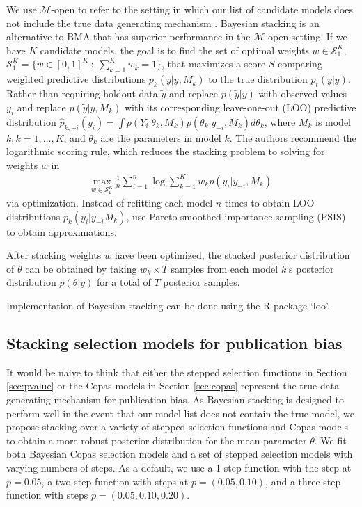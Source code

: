 \documentclass[12pt]{article}   	%
\numberwithin{equation}{section}
\begin{document}
We use $\mathcal{M}$-open to refer to the setting in which our list of candidate models does not include the true data generating mechanism \citep{bernardo2009}. Bayesian stacking \citep{yao2018stacking} is an alternative to BMA that has superior performance in the $\mathcal{M}$-open setting. If we have $K$ candidate models, the goal is to find the set of optimal weights $w \in \mathcal{S}_1^K$, $\mathcal{S}_1^K = \{w \in [0,1]^K \: : \: \sum_{k = 1}^K w_k = 1\}$, that maximizes a score $S$ comparing weighted predictive distributions  $p_k(\tilde{y} \vert y, M_k)$ to the true distribution $p_t(\tilde{y} \vert y)$. Rather than requiring holdout data $\tilde{y}$ and \citet{yao2018stacking} replace $p(\tilde{y} \vert y)$ with observed values $y_i$ and replace $p(\tilde{y} \vert y, M_k)$ with its corresponding leave-one-out (LOO) predictive distribution $\hat{p}_{k, -i}(y_i) = \int p(Y_i \vert \theta_k, M_k) p(\theta_k \vert y_{-i}, M_k) d\theta_k$, where $M_k$ is model $k, k = 1, \dots, K$, and $\theta_k$ are the parameters in model $k$. The authors recommend the logarithmic scoring rule, which reduces the stacking problem to solving for weights $w$ in 
\begin{align}
\underset{w \in \mathcal{S}_1^K}{\mbox{max}} \: \frac{1}{n} \sum_{i = 1}^n \log \sum_{k = 1}^K w_k p(y_i \vert y_{-i}, M_k)
\end{align}
via optimization. Instead of refitting each model $n$ times to obtain LOO distributions ${p}_{k}(y_i \vert y_{-i} M_k)$, \citet{yao2018stacking} use Pareto smoothed importance sampling (PSIS) \citep{vehtari2017psis} to obtain approximations. 

After stacking weights $w$ have been optimized, the stacked posterior distribution of $\theta$ can be obtained by taking $w_k \times T$ samples from each model $k$'s posterior distribution $p(\theta \vert y)$ for a total of $T$ posterior samples. 


Implementation of Bayesian stacking can be done using the R package `loo'. 


\subsection{Stacking selection models for publication bias}

It would be naive to think that either the stepped selection functions in Section \ref{sec:pvalue} or the Copas models in Section \ref{sec:copas} represent the true data generating mechanism for publication bias. As Bayesian stacking is designed to perform well in the event that our model list does not contain the true model, we propose stacking over a variety of stepped selection functions and Copas models to obtain a more robust posterior distribution for the mean parameter $\theta$. We fit both Bayesian Copas selection models \citep{mavridis2013copas, bai2020} and a set of stepped selection models with varying numbers of steps. As a default, we use a 1-step function with the step at $p=0.05$, a two-step function with steps at $p = (0.05, 0.10)$, and a three-step function with steps $p = (0.05, 0.10, 0.20)$. 
\end{document}
